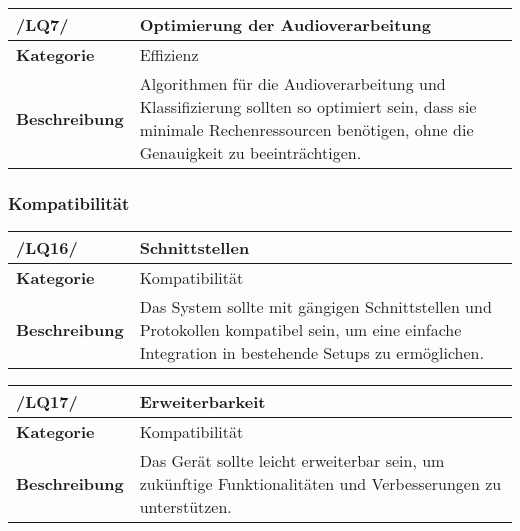 \begin{table}[h!]
	\begin{tabularx}{\textwidth}{|l|X|}
		\hline
		\textbf{/LQ7/} & \textbf{Optimierung der Audioverarbeitung} \\ \hline
		\textbf{Kategorie} & Effizienz \\ \hline
		\textbf{Beschreibung} & Algorithmen für die Audioverarbeitung und Klassifizierung sollten so optimiert sein, dass sie minimale Rechenressourcen benötigen, ohne die Genauigkeit zu beeinträchtigen. \\ \hline
	\end{tabularx}
\end{table}

\subsubsection{Kompatibilität}

\begin{table}[h!]
\begin{tabularx}{13cm}{|l|X|}
\hline
\textbf{/LQ16/} & \textbf{Schnittstellen} \\ \hline
\textbf{Kategorie} & Kompatibilität \\ \hline
\textbf{Beschreibung} & Das System sollte mit gängigen Schnittstellen und Protokollen kompatibel sein, um eine einfache Integration in bestehende Setups zu ermöglichen. \\ \hline
\end{tabularx}
\end{table}

\begin{table}[h!]
\begin{tabularx}{13cm}{|l|X|}
\hline
\textbf{/LQ17/} & \textbf{Erweiterbarkeit} \\ \hline
\textbf{Kategorie} & Kompatibilität \\ \hline
\textbf{Beschreibung} & Das Gerät sollte leicht erweiterbar sein, um zukünftige Funktionalitäten und Verbesserungen zu unterstützen. \\ \hline
\end{tabularx}
\end{table}
